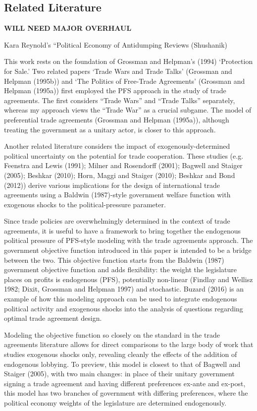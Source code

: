 \documentclass[10pt]{article}
\begin{document}
\subsection{Related Literature}
\textbf{WILL NEED MAJOR OVERHAUL}

Kara Reynold's ``Political Economy of Antidumping Reviews (Shushanik)

This work rests on the foundation of Grossman and Helpman's (1994) `Protection for Sale.' Two related papers `Trade Wars and Trade Talks' (Grossman and Helpman (1995b)) and `The Politics of Free-Trade Agreements' (Grossman and Helpman (1995a)) first employed the PFS approach in the study of trade agreements. The first considers ``Trade Wars'' and ``Trade Talks'' separately, whereas my approach views the ``Trade War'' as a crucial subgame. The model of preferential trade agreements (Grossman and Helpman (1995a)), although treating the government as a unitary actor, is closer to this approach.

Another related literature considers the impact of exogenously-determined political uncertainty on the potential for trade cooperation. These studies (e.g. Feenstra and Lewis (1991); Milner and Rosendorff (2001); Bagwell and Staiger (2005); Beshkar (2010); Horn, Maggi and Staiger (2010); Beshkar and Bond (2012)) derive various implications for the design of international trade agreements using a Baldwin (1987)-style government welfare function with exogenous shocks to the political-pressure parameter. 

Since trade policies are overwhelmingly determined in the context of trade agreements, it is useful to have a framework to bring together the endogenous political pressure of PFS-style modeling with the trade agreements approach. The government objective function introduced in this paper is intended to be a bridge between the two. This objective function starts from the Baldwin (1987) government objective function and adds flexibility: the weight the legislature places on profits is endogenous (PFS), potentially non-linear (Findlay and Wellisz 1982; Dixit, Grossman and Helpman 1997) and stochastic. Buzard (2016) is an example of how this modeling approach can be used to integrate  endogenous political activity and exogenous shocks into the analysis of questions regarding optimal trade agreement design.

Modeling the objective function so closely on the standard in the trade agreements literature allows for direct comparisons to the large body of work that studies exogenous shocks only, revealing cleanly the effects of the addition of endogenous lobbying. To preview, this model is closest to that of Bagwell and Staiger (2005), with two main changes: in place of their unitary government signing a trade agreement and having different preferences ex-ante and ex-post, this model has two branches of government with differing preferences, where the political economy weights of the legislature are determined endogenously.
		
\end{document}
